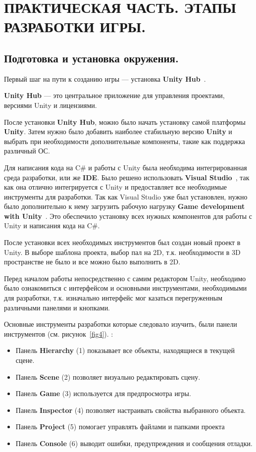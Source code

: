\chapter{\label{ch:ch02}ПРАКТИЧЕСКАЯ ЧАСТЬ. ЭТАПЫ РАЗРАБОТКИ ИГРЫ.}

\section{\label{sec:ch02/sec01/sub01}Подготовка и установка окружения.}

Первый шаг на пути к созданию игры — установка \textbf{Unity Hub}~\cite{UnHub}. 

\textbf{Unity Hub} --- это центральное приложение для управления проектами, версиями Unity и лицензиями. 

После установки \textbf{Unity Hub}, можно было начать установку самой платформы \textbf{Unity}. Затем нужно было добавить наиболее стабильную версию \textbf{Unity} и выбрать при необходимости дополнительные компоненты, такие как поддержка различный ОС.

Для написания кода на C\# и работы с Unity была необходима интегрированная среда разработки, или же \textbf{IDE}. Было решено использовать \textbf{Visual Studio}~\cite{vscodeRu}, так как она отлично интегрируется с Unity и предоставляет все необходимые инструменты для разработки. Так как Visual Studio уже был установлен, нужно было дополнительно к нему загрузить рабочую нагрузку \textbf{Game development with Unity}~\cite{vsUn}. Это обеспечило установку всех нужных компонентов для работы с Unity и написания кода на C\#.

После установки всех необходимых инструментов был создан новый проект в Unity. В выборе шаблона проекта, выбор пал на 2D, т.к. необходимости в 3D пространстве не было и все можно было выполнить в 2D. 

Перед началом работы непосредственно с самим редактором Unity, необходимо было ознакомиться с интерфейсом и основными инструментами, необходимыми для разработки, т.к. изначально интерфейс мог казаться перегруженным различными панелями и кнопками. 

Основные инструменты разработки которые следовало изучить, были панели инструментов (см. рисунок~\ref{fig4}). : 
	\begin{itemize}
		\item Панель \textbf{Hierarchy} (1) показывает все объекты, находящиеся в текущей сцене.
		\item Панель \textbf{Scene} (2) позволяет визуально редактировать сцену. 
		\item Панель \textbf{Game} (3) используется для предпросмотра игры. 
		\item Панель \textbf{Inspector} (4) позволяет настраивать свойства выбранного объекта.
            \item Панель \textbf{Project} (5) помогает управлять файлами и папками проекта
            \item Панель \textbf{Console} (6) выводит ошибки, предупреждения и сообщения отладки.
	\end{itemize}

